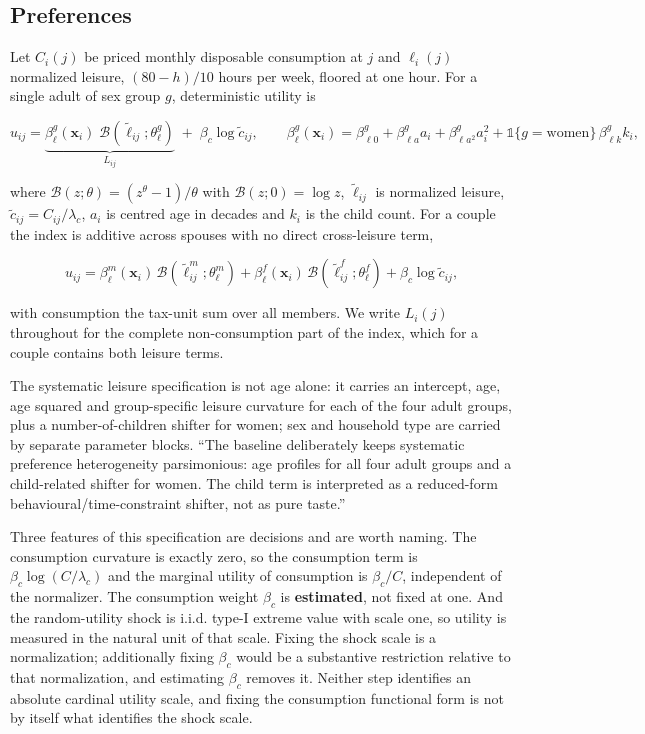 \documentclass[11pt,a4paper]{article}
\begin{document}
\subsection{Preferences}\label{preferences}

Let \(C_i(j)\) be priced monthly disposable consumption at \(j\) and \(\ell_i(j)\) normalized leisure, \((80-h)/10\) hours per week, floored at one hour. For a single adult of sex group \(g\), deterministic utility is

\[
u_{ij}=\underbrace{\beta_{\ell}^{g}(\mathbf x_i)\;
\mathcal B\!\left(\tilde\ell_{ij};\theta_{\ell}^{g}\right)}_{L_{ij}}
\;+\;\beta_c\log\tilde c_{ij},
\qquad
\beta_{\ell}^{g}(\mathbf x_i)=\beta_{\ell 0}^{g}+\beta_{\ell a}^{g}a_i
+\beta_{\ell a^{2}}^{g}a_i^{2}
+\mathbb 1\{g=\text{women}\}\,\beta_{\ell k}^{g}k_i,
\]

where \(\mathcal B(z;\theta)=(z^{\theta}-1)/\theta\) with \(\mathcal B(z;0)=\log z\), \(\tilde\ell_{ij}\) is normalized leisure, \(\tilde c_{ij}=C_{ij}/\lambda_c\), \(a_i\) is centred age in decades and \(k_i\) is the child count. For a couple the index is additive across spouses with no direct cross-leisure term,

\[
u_{ij}=\beta_{\ell}^{m}(\mathbf x_i)\,\mathcal B(\tilde\ell^{m}_{ij};\theta_{\ell}^{m})
      +\beta_{\ell}^{f}(\mathbf x_i)\,\mathcal B(\tilde\ell^{f}_{ij};\theta_{\ell}^{f})
      +\beta_c\log\tilde c_{ij},
\]

with consumption the tax-unit sum over all members. We write \(L_i(j)\) throughout for the complete non-consumption part of the index, which for a couple contains both leisure terms.

The systematic leisure specification is not age alone: it carries an intercept, age, age squared and group-specific leisure curvature for each of the four adult groups, plus a number-of-children shifter for women; sex and household type are carried by separate parameter blocks. ``The baseline deliberately keeps systematic preference heterogeneity parsimonious: age profiles for all four adult groups and a child-related shifter for women. The child term is interpreted as a reduced-form behavioural/time-constraint shifter, not as pure taste.''

Three features of this specification are decisions and are worth naming. The consumption curvature is exactly zero, so the consumption term is \(\beta_c\log(C/\lambda_c)\) and the marginal utility of consumption is \(\beta_c/C\), independent of the normalizer. The consumption weight \(\beta_c\) is \textbf{estimated}, not fixed at one. And the random-utility shock is i.i.d. type-I extreme value with scale one, so utility is measured in the natural unit of that scale. Fixing the shock scale is a normalization; additionally fixing \(\beta_c\) would be a substantive restriction relative to that normalization, and estimating \(\beta_c\) removes it. Neither step identifies an absolute cardinal utility scale, and fixing the consumption functional form is not by itself what identifies the shock scale.
\end{document}
